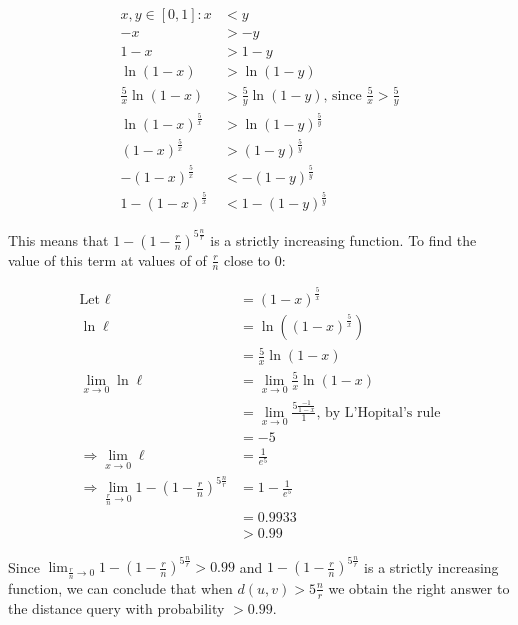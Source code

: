 \documentclass[addpoints]{exam}
\begin{document}
\begin{questions}
\begin{parts}
\begin{equation*}
\begin{aligned}
x, y \in [0,1]: x&< y\\
-x &> -y\\
1-x &>1-y\\
\ln(1-x) &> \ln(1-y)\\
\frac{5}{x}\ln(1-x) &> \frac{5}{y}\ln(1-y) \text{, since } \frac{5}{x}>\frac{5}{y}\\
\ln(1-x)^{\frac{5}{x}} &> \ln(1-y)^{\frac{5}{y}}\\
(1-x)^{\frac{5}{x}} &> (1-y)^{\frac{5}{y}}\\
-(1-x)^{\frac{5}{x}} &< -(1-y)^{\frac{5}{y}}\\
1-(1-x)^{\frac{5}{x}} &< 1-(1-y)^{\frac{5}{y}}
\end{aligned}
\end{equation*}

This means that $1- \left (1-\frac{r}{n} \right )^{5\frac{n}{r}}$ is a strictly increasing function. To find the value of this term at values of of $\frac{r}{n}$ close to $0$:

\begin{equation*}
\begin{aligned}
\text{Let } \ell &= (1-x)^{\frac{5}{x}}\\
\ln \ell &= \ln \left((1-x)^{\frac{5}{x}} \right)\\
&= \frac{5}{x} \ln (1-x)\\
\lim_{x \to 0} \ln \ell  &= \lim_{x \to 0} \frac{5}{x} \ln (1-x)\\
&=  \lim_{x \to 0} \frac{5\frac{-1}{1-x}}{1}\text{, by L'Hopital's rule}\\
&= -5\\
\Rightarrow \lim_{x \to 0} \ell &= \frac{1}{e^5}\\
\Rightarrow \lim_{\frac{r}{n} \to 0} 1- \left (1-\frac{r}{n} \right )^{5\frac{n}{r}} &= 1 - \frac{1}{e^5}\\
&= 0.9933\\
&> 0.99
\end{aligned}
\end{equation*}

Since $\lim_{\frac{r}{n} \to 0}1- \left (1-\frac{r}{n} \right )^{5\frac{n}{r}} > 0.99$ and $1- \left (1-\frac{r}{n} \right )^{5\frac{n}{r}} $ is a strictly increasing function, we can conclude that when $d(u,v) > 5\frac{n}{r}$ we obtain the right answer to the distance query with probability $> 0.99$.

\end{parts}


\end{questions}
\end{document}

